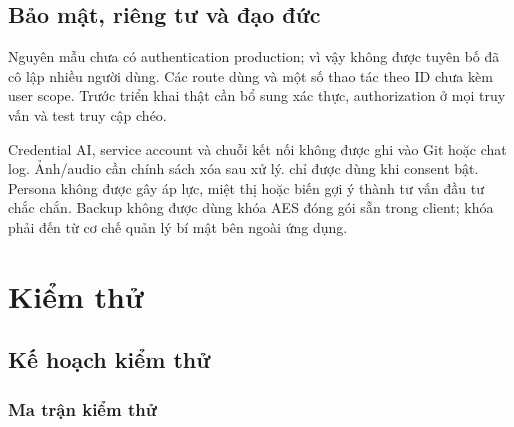 \subsection{Bảo mật, riêng tư và đạo đức}

Nguyên mẫu chưa có authentication production; vì vậy không được tuyên bố đã cô lập nhiều người dùng. Các route dùng  và một số thao tác theo ID chưa kèm user scope. Trước triển khai thật cần bổ sung xác thực, authorization ở mọi truy vấn và test truy cập chéo.

Credential AI, service account và chuỗi kết nối không được ghi vào Git hoặc chat log. Ảnh/audio cần chính sách xóa sau xử lý.  chỉ được dùng khi consent bật. Persona không được gây áp lực, miệt thị hoặc biến gợi ý thành tư vấn đầu tư chắc chắn. Backup không được dùng khóa AES đóng gói sẵn trong client; khóa phải đến từ cơ chế quản lý bí mật bên ngoài ứng dụng.

\section{Kiểm thử}

\subsection{Kế hoạch kiểm thử}

\subsubsection{Ma trận kiểm thử}

